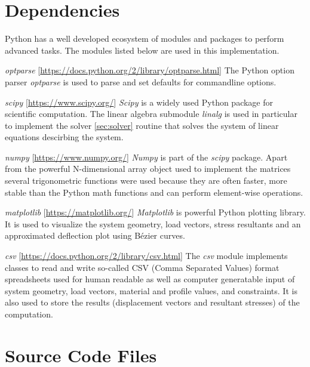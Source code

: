 \section{Dependencies}
\label{sec:depend}

Python has a well developed ecosystem of modules and packages to perform advanced tasks.
The modules listed below are used in this implementation.
 
\textit{optparse} [\url{https://docs.python.org/2/library/optparse.html}] \linebreak
The Python option parser \textit{optparse} is used to parse and set defaults for commandline options.

\textit{scipy} [\url{https://www.scipy.org/}]\linebreak
\textit{Scipy} is a widely used Python package for scientific computation. The linear algebra submodule \textit{linalg} is used in particular to implement the solver \ref{sec:solver} routine that solves the system of linear equations descirbing the system.

\textit{numpy} [\url{https://www.numpy.org/}]\linebreak
\textit{Numpy} is part of the \textit{scipy} package. Apart from the powerful N-dimensional array object used to implement the matrices several trigonometric functions were used because they are often faster, more stable than the Python math functions and can perform element-wise operations.

\textit{matplotlib} [\url{https://matplotlib.org/}]\linebreak
\textit{Matplotlib} is powerful Python plotting library. It is used to visualize the system geometry, load vectors, stress resultants and an approximated deflection plot using B\'{e}zier curves.

\textit{csv} [\url{https://docs.python.org/2/library/csv.html}]\linebreak
The \textit{csv} module implements classes to read and write so-called CSV (Comma Separated Values) format spreadsheets used for human readable as well as computer generatable input of system geometry, load vectors, material and profile values, and constraints.
It is also used to store the results (displacement vectors and resultant stresses) of the computation.


\section{Source Code Files}
\label{sec:srcfiles}



